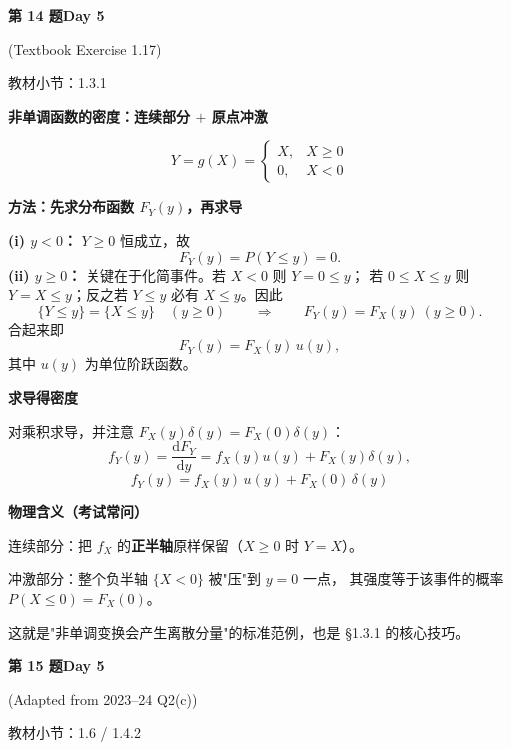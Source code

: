 \documentclass[10.5pt,fontset=fandol]{ctexart}
\newcommand{\key}[1]{\par\vspace{4pt}\noindent\textbf{\color{navy}#1}\par\vspace{2pt}}
\newcommand{\dd}{\mathrm d}\newcommand{\Var}{\operatorname{Var}}\newcommand{\Cov}{\operatorname{Cov}}
\newcommand{\qtitle}[2]{\par\addvspace{1.2em}\Needspace{8\baselineskip}\begin{tcolorbox}[colback=navy,colframe=navy,arc=1.5pt,boxrule=0pt]\color{white}\large\bfseries #1\hfill\small #2\end{tcolorbox}}
\begin{document}
\qtitle{第 14 题}{Day 5}
{\small\color{accentred}(Textbook Exercise 1.17)}\par\smallskip
{\small\color{muted}教材小节：1.3.1}\par\medskip
\noindent\textbf{非单调函数的密度：连续部分 $+$ 原点冲激}\par\smallskip\begin{tcolorbox}[breakable,colback=qbg,colframe=qbg,boxrule=0pt]\[
Y=g(X)=\begin{cases}X, & X\ge0\\ 0, & X<0\end{cases}
\]

\key{方法：先求分布函数 $F_Y(y)$，再求导}
\noindent\textbf{(i) $y<0$：} $Y\ge0$ 恒成立，故
\[
F_Y(y)=P(Y\le y)=0 .
\]
\noindent\textbf{(ii) $y\ge0$：} 关键在于化简事件。若 $X<0$ 则 $Y=0\le y$；
若 $0\le X\le y$ 则 $Y=X\le y$；反之若 $Y\le y$ 必有 $X\le y$。因此
\[
\{Y\le y\}=\{X\le y\}\quad(y\ge0)
\qquad\Longrightarrow\qquad
F_Y(y)=F_X(y)\ (y\ge0).
\]
合起来即
\[
F_Y(y)=F_X(y)\,u(y),
\]
其中 $u(y)$ 为单位阶跃函数。

\key{求导得密度}
对乘积求导，并注意 $F_X(y)\delta(y)=F_X(0)\delta(y)$：
\[
f_Y(y)=\frac{\dd F_Y}{\dd y}=f_X(y)u(y)+F_X(y)\delta(y),
\]
\[
\boxed{\,f_Y(y)=f_X(y)\,u(y)+F_X(0)\,\delta(y)\,}
\]

\key{物理含义（考试常问）}
\begin{bul}
  \item 连续部分：把 $f_X$ 的\textbf{正半轴}原样保留（$X\ge0$ 时 $Y=X$）。
  \item 冲激部分：整个负半轴 $\{X<0\}$ 被"压"到 $y=0$ 一点，
        其强度等于该事件的概率 $P(X\le0)=F_X(0)$。
\end{bul}
这就是"非单调变换会产生离散分量"的标准范例，也是 §1.3.1 的核心技巧。
\end{tcolorbox}
\qtitle{第 15 题}{Day 5}
{\small\color{accentred}(Adapted from 2023--24 Q2(c))}\par\smallskip
{\small\color{muted}教材小节：1.6 / 1.4.2}\par\medskip
\end{document}
